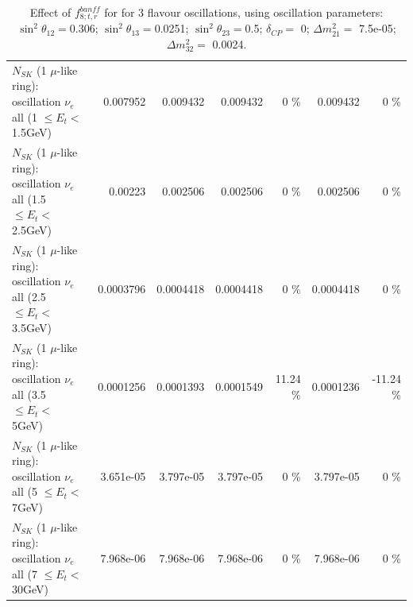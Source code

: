 \begin{table}
\begin{tabular}{| l | r | r | r  r | r  r |}
$N_{SK}$ (1 $\mu$-like ring): oscillation $\nu_{e}$ all (1 $\leq E_{t} <$ 1.5GeV) &        0.007952 &        0.009432 &        0.009432 &        0 \%  &        0.009432 &        0 \%  \\ 
$N_{SK}$ (1 $\mu$-like ring): oscillation $\nu_{e}$ all (1.5 $\leq E_{t} <$ 2.5GeV) &         0.00223 &        0.002506 &        0.002506 &        0 \%  &        0.002506 &        0 \%  \\ 
$N_{SK}$ (1 $\mu$-like ring): oscillation $\nu_{e}$ all (2.5 $\leq E_{t} <$ 3.5GeV) &       0.0003796 &       0.0004418 &       0.0004418 &        0 \%  &       0.0004418 &        0 \%  \\ 
$N_{SK}$ (1 $\mu$-like ring): oscillation $\nu_{e}$ all (3.5 $\leq E_{t} <$ 5GeV) &       0.0001256 &       0.0001393 &       0.0001549 &    11.24 \%  &       0.0001236 &   -11.24 \%  \\ 
 $N_{SK}$ (1 $\mu$-like ring): oscillation $\nu_{e}$ all (5 $\leq E_{t} <$ 7GeV) &       3.651e-05 &       3.797e-05 &       3.797e-05 &        0 \%  &       3.797e-05 &        0 \%  \\ 
$N_{SK}$ (1 $\mu$-like ring): oscillation $\nu_{e}$ all (7 $\leq E_{t} <$ 30GeV) &       7.968e-06 &       7.968e-06 &       7.968e-06 &        0 \%  &       7.968e-06 &        0 \%  \\ 
\hline
\hline
\end{tabular}
\caption{ Effect of $f_{8; t, r}^{banff}$ for for 3 flavour oscillations, using oscillation parameters:  $\sin^2\theta_{12} = $0.306; $\sin^2\theta_{13} = $0.0251; $\sin^2\theta_{23} = $0.5; $\delta_{CP} = $        0; $\Delta m^2_{21} = $    7.5e-05; $\Delta m^2_{32} = $    0.0024. }
\label{tab:num_banff_08_1RmuT_3f_osc_t13:0.0251}
\end{table}
\clearpage
